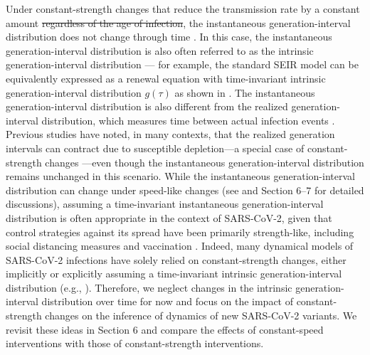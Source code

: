 \documentclass[12pt]{article}
\providecommand{\DIFaddtex}[1]{{\protect\color{blue}\uwave{#1}}} %
\providecommand{\DIFdeltex}[1]{{\protect\color{red}\sout{#1}}}                      %
\providecommand{\DIFaddbegin}{} %
\providecommand{\DIFaddend}{} %
\providecommand{\DIFdelbegin}{} %
\providecommand{\DIFdelend}{} %
\providecommand{\DIFadd}[1]{\texorpdfstring{\DIFaddtex{#1}}{#1}} %
\providecommand{\DIFdel}[1]{\texorpdfstring{\DIFdeltex{#1}}{}} %
\newcommand{\DIFscaledelfig}{0.5}
\newlength{\DIFdelgraphicswidth} %
\newlength{\DIFdelgraphicsheight} %
\newcommand{\DIFaddincludegraphics}[2][]{{\color{blue}\fbox{\DIFOincludegraphics[#1]{#2}}}} %
\newcommand{\DIFdelincludegraphics}[2][]{%
\sbox{\DIFdelgraphicsbox}{\DIFOincludegraphics[#1]{#2}}%
\settoboxwidth{\DIFdelgraphicswidth}{\DIFdelgraphicsbox} %
\settoboxtotalheight{\DIFdelgraphicsheight}{\DIFdelgraphicsbox} %
\scalebox{\DIFscaledelfig}{%
\parbox[b]{\DIFdelgraphicswidth}{\usebox{\DIFdelgraphicsbox}\\[-\baselineskip] \rule{\DIFdelgraphicswidth}{0em}}\llap{\resizebox{\DIFdelgraphicswidth}{\DIFdelgraphicsheight}{%
\setlength{\unitlength}{\DIFdelgraphicswidth}%
\begin{picture}(1,1)%
\thicklines\linethickness{2pt} %
{\color[rgb]{1,0,0}\put(0,0){\framebox(1,1){}}}%
{\color[rgb]{1,0,0}\put(0,0){\line( 1,1){1}}}%
{\color[rgb]{1,0,0}\put(0,1){\line(1,-1){1}}}%
\end{picture}%
}\hspace*{3pt}}} %
} %
\DeclareRobustCommand{\DIFaddbegin}{\DIFOaddbegin \let\includegraphics\DIFaddincludegraphics} %
\DeclareRobustCommand{\DIFaddend}{\DIFOaddend \let\includegraphics\DIFOincludegraphics} %
\DeclareRobustCommand{\DIFdelbegin}{\DIFOdelbegin \let\includegraphics\DIFdelincludegraphics} %
\DeclareRobustCommand{\DIFdelend}{\DIFOaddend \let\includegraphics\DIFOincludegraphics} %
\begin{document}
Under constant-strength changes that reduce the transmission rate by a constant amount \DIFdelbegin \DIFdel{regardless of the age of infection}\DIFdelend \DIFaddbegin \DIFadd{across generation intervals}\DIFaddend , the instantaneous generation-interval distribution does not change through time \citep{fraser2007estimating}.
In this case, the instantaneous generation-interval distribution is also often referred to as the intrinsic generation-interval distribution \citep{champredon2015intrinsic,champredon2018two,gostic2020practical,park2020time}---
for example, the standard SEIR model can be equivalently expressed as a renewal equation with time-invariant intrinsic generation-interval distribution $g(\tau)$ as shown in \citep{champredon2018equivalence}.
The instantaneous generation-interval distribution is also different from the realized generation-interval distribution, which measures time between actual infection events \citep{champredon2015intrinsic}.
Previous studies have noted, in many contexts, that the realized generation intervals can contract due to susceptible depletion---a special case of constant-strength changes \citep{kenah2008generation,nishiura2010time,champredon2015intrinsic}---even though the instantaneous generation-interval distribution remains unchanged in this scenario.
While the instantaneous generation-interval distribution can change under speed-like changes (see \cite{fraser2007estimating} and Section 6--7 for detailed discussions), assuming a time-invariant instantaneous generation-interval distribution is often appropriate in the context of SARS-CoV-2, given that control strategies against its spread have been primarily strength-like, including social distancing measures \citep{flaxman2020Rt} and vaccination \citep{moore2021vaccination}.
Indeed, many dynamical models of SARS-CoV-2 infections have solely relied on constant-strength changes, either implicitly or explicitly assuming a time-invariant intrinsic generation-interval distribution (e.g., \citep{flaxman2020Rt,gostic2020practical,brauner2021inferring}).
Therefore, we neglect changes in the intrinsic generation-interval distribution over time for now and focus on the impact of constant-strength changes on the inference of dynamics of new SARS-CoV-2 variants.
We revisit these ideas in Section 6 and compare the effects of constant-speed interventions with those of constant-strength interventions.
\end{document}
